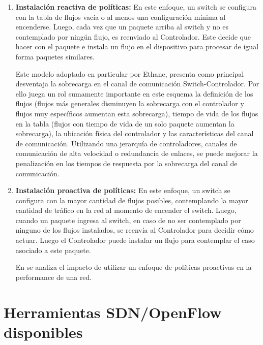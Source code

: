 \begin{enumerate}
\item \textbf{Instalación reactiva de políticas:} En este enfoque, un switch se configura con la tabla de flujos vac\'ia o al menos una configuración mínima al encenderse. Luego, cada vez que un paquete arriba al switch y no es contemplado por ning\'un flujo, es reenviado al Controlador. Este decide que hacer con el paquete e instala un flujo en el dispositivo para procesar de igual forma paquetes similares.

Este modelo adoptado en particular por Ethane\cite{casado2007ethane}, presenta como principal desventaja la sobrecarga en el canal de comunicación Switch-Controlador. Por ello juega un rol sumamente importante en este esquema la definición de los flujos (flujos m\'as generales disminuyen la sobrecarga con el controlador y flujos muy específicos aumentan esta sobrecarga), tiempo de vida de los flujos en la tabla (flujos con tiempo de vida de un solo paquete aumentan la sobrecarga), la ubicación física del controlador y las características del canal de comunicación. Utilizando una jerarquía de controladores, canales de comunicación de alta velocidad o redundancia de enlaces, se puede mejorar la penalizaci\'on en los tiempos de respuesta por la sobrecarga del canal de comunicación. 

\item \textbf{Instalación proactiva de políticas:} En este enfoque, un switch se configura con la mayor cantidad de flujos posibles, contemplando la mayor cantidad de tr\'afico en la red al momento de encender el switch. Luego, cuando un paquete ingresa al switch, en caso de no ser contemplado por ninguno de los flujos instalados, se reenvía al Controlador para decidir c\'omo actuar. Luego el Controlador puede instalar un flujo para contemplar el caso asociado a este paquete. 

En \cite{yu2011scalable} se analiza el impacto de utilizar un enfoque de políticas proactivas en la performance de una red.  

\end{enumerate} 


\section{Herramientas SDN/OpenFlow disponibles}

